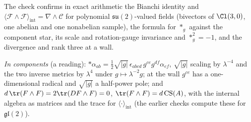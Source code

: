 The check confirms in exact arithmetic the Bianchi identity and $\langle\mathcal{F}\wedge\mathcal{F}\rangle_{\mathrm{int}} = \nabla\wedge\mathcal{C}$ for polynomial $\mathfrak{su}(2)$-valued fields (bivectors of $\Cl(3,0)$, one abelian and one nonabelian sample), the formula for ${*}_{g}$ against the component star, its scale and rotation-gauge invariance and ${*}_{g}^{2} = -1$, and the divergence and rank three at a wall.

\emph{In components} (a reading): ${*}\alpha_{ab} = \tfrac12\sqrt{|g|}\,\epsilon_{abcd}\,g^{ce}g^{df}\alpha_{ef}$, $\sqrt{|g|}$ scaling by $\lambda^{-4}$ and the two inverse metrics by $\lambda^{4}$ under $g \mapsto \lambda^{-2}g$; at the wall $g^{ce}$ has a one-dimensional radical and $\sqrt{|g|}$ a half-power pole; and $d\,\tr(F\wedge F) = 2\tr(DF\wedge F) = 0$, $\tr(F\wedge F) = d\,\mathrm{CS}(A)$, with the internal algebra as matrices and the trace for $\langle\cdot\rangle_{\mathrm{int}}$ (the earlier checks compute these for $\mathfrak{gl}(2)$).
